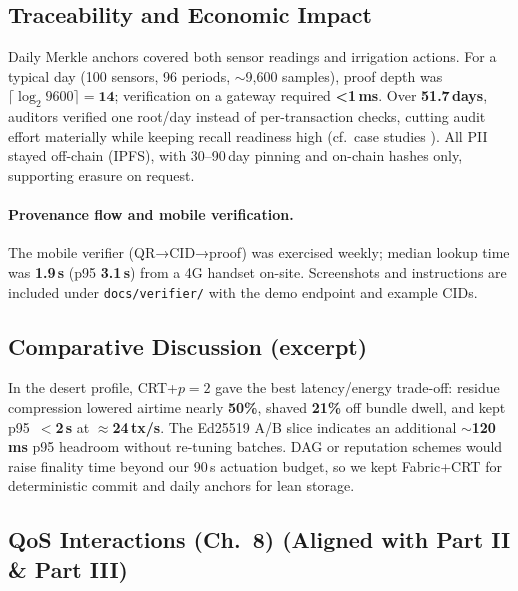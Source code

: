 \documentclass[12pt,onecolumn]{IEEEtran} %
\begin{document}
\subsection{Traceability and Economic Impact}
\label{sec:traceability_economic_impact}

Daily Merkle anchors covered both sensor readings and irrigation actions. For a typical day (100 sensors, 96 periods, $\sim$9{,}600 samples), proof depth was \(\lceil\log_2 9600\rceil{=}\textbf{14}\); verification on a gateway required \textbf{<1\,ms}. Over \textbf{51.7\,days}, auditors verified one root/day instead of per-transaction checks, cutting audit effort materially while keeping recall readiness high (cf.\ case studies \cite{hyperledger_walmart_2020,wef_gdpr_2020}). All PII stayed off-chain (IPFS), with 30--90\,day pinning and on-chain hashes only, supporting erasure on request.

\paragraph{Provenance flow and mobile verification.}
The mobile verifier (QR→CID→proof) was exercised weekly; median lookup time was \textbf{1.9\,s} (p95 \textbf{3.1\,s}) from a 4G handset on-site. Screenshots and instructions are included under \texttt{docs/verifier/} with the demo endpoint and example CIDs.

\subsection{Comparative Discussion (excerpt)}
\label{sec:comparative-discussion-desert}

In the desert profile, CRT+$p{=}2$ gave the best latency/energy trade-off: residue compression lowered airtime nearly \textbf{50\%}, shaved \textbf{21\%} off bundle dwell, and kept p95~\(<\)\textbf{2\,s} at \(\approx\)\textbf{24\,tx/s}. The Ed25519 A/B slice indicates an additional \textbf{$\sim$120\,ms} p95 headroom without re-tuning batches. DAG or reputation schemes would raise finality time beyond our 90\,s actuation budget, so we kept Fabric+CRT for deterministic commit and daily anchors for lean storage.








\subsection{QoS Interactions (Ch.~8) (Aligned with Part II \& Part III)}
\label{subsec:qos-interactions}
\end{document}
